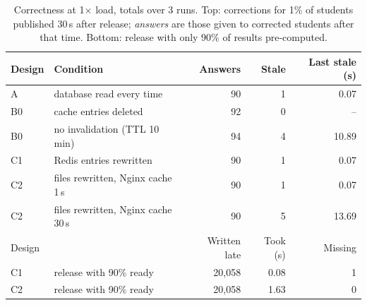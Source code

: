 \begin{table}[t]
\caption{Correctness at 1$\times$ load, totals over 3 runs. Top: corrections for 1\% of students published 30\,s after release; \emph{answers} are those given to corrected students after that time. Bottom: release with only 90\% of results pre-computed.}
\label{tab:correct}
\centering
\footnotesize
\setlength{\tabcolsep}{3pt}
\begin{tabular}{@{}lp{2.9cm}rrr@{}}
\toprule
Design & Condition & Answers & Stale & Last stale (s) \\
\midrule
A & database read every time & 90 & 1 & 0.07 \\
B0 & cache entries deleted & 92 & 0 & -- \\
B0 & no invalidation (TTL 10 min) & 94 & 4 & 10.89 \\
C1 & Redis entries rewritten & 90 & 1 & 0.07 \\
C2 & files rewritten, Nginx cache 1\,s & 90 & 1 & 0.07 \\
C2 & files rewritten, Nginx cache 30\,s & 90 & 5 & 13.69 \\
\midrule
Design & & Written late & Took (s) & Missing \\
\midrule
C1 & release with 90\% ready & 20,058 & 0.08 & 1 \\
C2 & release with 90\% ready & 20,058 & 1.63 & 0 \\
\bottomrule
\end{tabular}
\end{table}
